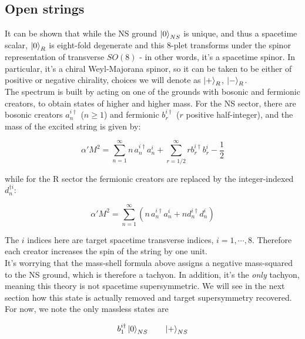 \subsection{Open strings}

It can be shown that while the NS ground $\ket{0}_{NS}$ is unique, and thus a spacetime scalar, $\ket{0}_R$ is eight-fold degenerate and this 8-plet transforms under the spinor representation of transverse $SO(8)$ - in other words, it's a spacetime spinor. In particular, it's a chiral Weyl-Majorana spinor, so it can be taken to be either of positive or negative chirality, choices we will denote as $\ket{+}_R$, $\ket{-}_R$.\\

The spectrum is built by acting on one of the grounds with bosonic and fermionic creators, to obtain states of higher and higher mass. For the NS sector, there are bosonic creators $a_n^{i\dagger}$ ($n\geq 1$) and fermionic $b_r^{i\dagger}$ ($r$ positive half-integer), and the mass of the excited string is given by:

\begin{equation}
	\alpha' M^2 = \sum_{n=1}^\infty n \,a_n^{i\dagger} a_n^i  + \sum_{r=1/2}^\infty r b_r^{i\dagger} b_r^i - \frac{1}{2}
	\label{}
\end{equation}

while for the R sector the fermionic creators are replaced by the integer-indexed $d_n^{\dagger i}$:

\begin{equation}
	\alpha' M^2 = \sum_{n=1}^\infty \left(n\, a_n^{i\dagger} a_n^i + n d_n^{i\dagger} d_n^i \right)
	\label{}
\end{equation}

The $i$ indices here are target spacetime transverse indices, $i=1,\cdots,8$. Therefore each creator increases the spin of the string by one unit.\\

It's worrying that the mass-shell formula above assigns a negative mass-squared to the NS ground, which is therefore a tachyon. In addition, it's the \emph{only} tachyon, meaning this theory is not spacetime supersymmetric. We will see in the next section how this state is actually removed and target supersymmetry recovered. For now, we note the only massless states are

\begin{equation}
	b_1^{i\dagger} \ket{0}_{NS} \quad \quad \ket{+}_{NS}
	\label{}
\end{equation}

